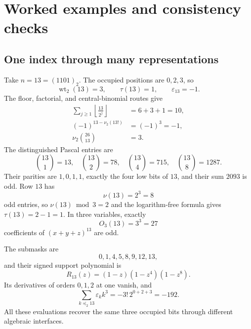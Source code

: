 \documentclass[11pt,oneside]{article}
\numberwithin{equation}{section}
\theoremstyle{definition}
\theoremstyle{remark}
\newcommand{\wt}{\operatorname{wt}_2}
\newcommand{\vtwo}{\nu_2}
\newcommand{\eps}{\varepsilon}
\newcommand{\submask}{\mathrel{\preccurlyeq_2}}
\begin{document}
\section[Worked examples]{Worked examples and consistency checks}
\label{sec:worked-examples}

\subsection{One index through many representations}

Take \(n=13=(1101)_2\).  The occupied positions are \(0,2,3\), so
\begin{equation}
  \wt(13)=3,
  \qquad
  \tau(13)=1,
  \qquad
  \eps_{13}=-1.
  \label{eq:example13-basic}
\end{equation}
The floor, factorial, and central-binomial routes give
\begin{align}
 \sum_{j\ge1}\left\lfloor\frac{13}{2^j}\right\rfloor
 &=6+3+1=10,
 \label{eq:example13-floor}\\
 (-1)^{13-\vtwo(13!)}&=(-1)^3=-1,
 \label{eq:example13-factorial}\\
 \vtwo\binom{26}{13}&=3.
 \label{eq:example13-central}
\end{align}
The distinguished Pascal entries are
\begin{equation}
 \binom{13}{1}=13,
 \quad
 \binom{13}{2}=78,
 \quad
 \binom{13}{4}=715,
 \quad
 \binom{13}{8}=1287.
 \label{eq:example13-probes}
\end{equation}
Their parities are \(1,0,1,1\), exactly the four low bits of \(13\), and their
sum \(2093\) is odd.  Row \(13\) has
\begin{equation}
  \nu(13)=2^3=8
  \label{eq:example13-odd-count}
\end{equation}
odd entries, so \(\nu(13)\bmod3=2\) and the logarithm-free formula gives
\(\tau(13)=2-1=1\).  In three variables, exactly
\begin{equation}
  O_3(13)=3^3=27
  \label{eq:example13-multinomial}
\end{equation}
coefficients of \((x+y+z)^{13}\) are odd.

The submasks are
\begin{equation}
  0,1,4,5,8,9,12,13,
  \label{eq:example13-submasks}
\end{equation}
and their signed support polynomial is
\begin{equation}
  R_{13}(z)=(1-z)(1-z^4)(1-z^8).
  \label{eq:example13-support-product}
\end{equation}
Its derivatives of orders \(0,1,2\) at one vanish, and
\begin{equation}
  \sum_{k\submask13}\eps_kk^3=-3!\,2^{0+2+3}=-192.
  \label{eq:example13-sparse-moment}
\end{equation}
All these evaluations recover the same three occupied bits through different
algebraic interfaces.
\end{document}
